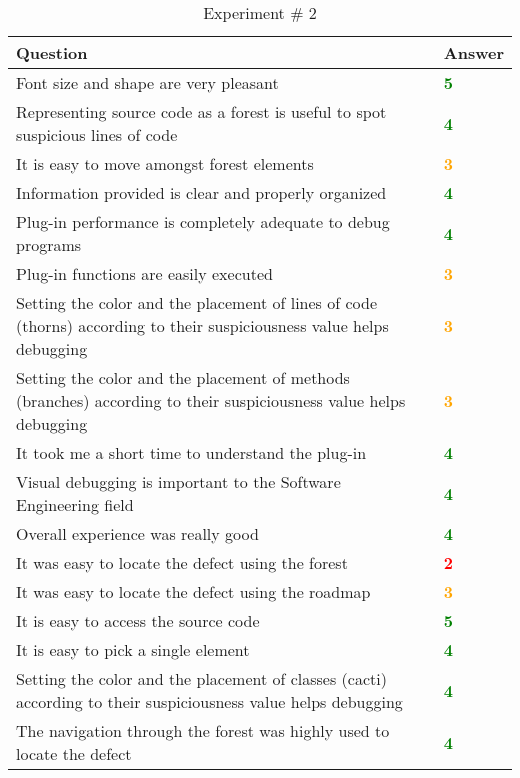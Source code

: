 \begin{table}
\caption{Experiment \# 2}
\begin{tabular}{m{11cm} | l}
    \textbf{Question} & \textbf{Answer}\\
    \hline
    Font size and shape are very pleasant & \textbf{\textcolor{green}{5}} \\ \hline
    Representing source code as a forest is useful to spot suspicious lines of code & \textbf{\textcolor{green}{4}} \\ \hline
    It is easy to move amongst forest elements & \textbf{\textcolor{orange}{3}} \\ \hline
    Information provided is clear and properly organized & \textbf{\textcolor{green}{4}} \\ \hline
    Plug-in performance is completely adequate to debug programs & \textbf{\textcolor{green}{4}} \\ \hline
    Plug-in functions are easily executed & \textbf{\textcolor{orange}{3}} \\ \hline
    Setting the color and the placement of lines of code (thorns) according to their suspiciousness value helps debugging & \textbf{\textcolor{orange}{3}} \\ \hline
    Setting the color and the placement of methods (branches) according to their suspiciousness value helps debugging & \textbf{\textcolor{orange}{3}} \\ \hline
    It took me a short time to understand the plug-in & \textbf{\textcolor{green}{4}} \\ \hline
    Visual debugging is important to the Software Engineering field & \textbf{\textcolor{green}{4}} \\ \hline
    Overall experience was really good & \textbf{\textcolor{green}{4}} \\ \hline
    It was easy to locate the defect using the forest & \textbf{\textcolor{red}{2}} \\ \hline
    It was easy to locate the defect using the roadmap &
    \textbf{\textcolor{orange}{3}} \\ \hline It is easy to access the source code & \textbf{\textcolor{green}{5}} \\ \hline
    It is easy to pick a single element & \textbf{\textcolor{green}{4}} \\ \hline
    Setting the color and the placement of classes (cacti) according to their
    suspiciousness value helps debugging & \textbf{\textcolor{green}{4}} \\ \hline The navigation through the forest was highly used to locate the defect & \textbf{\textcolor{green}{4}} \\ \hline

\end{tabular}
\end{table}
